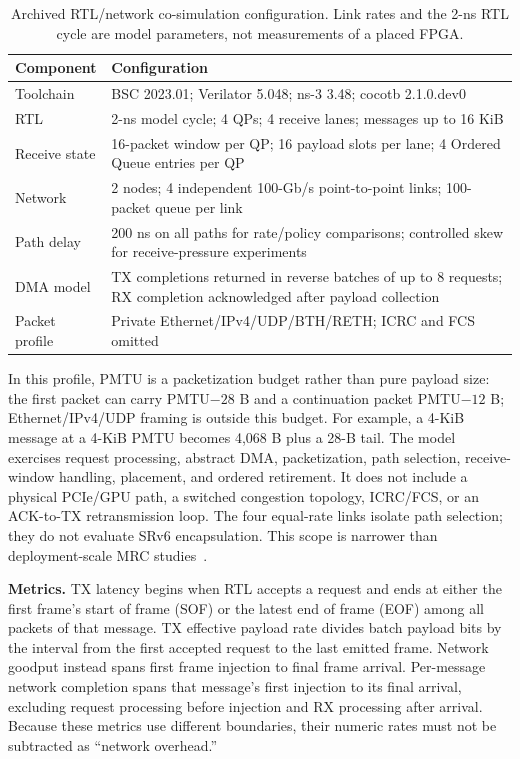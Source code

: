 \begin{table}[H]
  \centering
  \caption{Archived RTL/network co-simulation configuration.  Link rates and
  the 2-ns RTL cycle are model parameters, not measurements of a placed FPGA.}
  \label{tab:eval:configuration}
  \small
  \begin{tabular}{p{}p{}}
    \toprule
    Component & Configuration \\
    \midrule
    Toolchain & BSC 2023.01; Verilator 5.048; ns-3 3.48; cocotb 2.1.0.dev0 \\
    RTL & 2-ns model cycle; 4 QPs; 4 receive lanes; messages up to 16 KiB \\
    Receive state & 16-packet window per QP; 16 payload slots per lane;
      4 Ordered Queue entries per QP \\
    Network & 2 nodes; 4 independent 100-Gb/s point-to-point links;
      100-packet queue per link \\
    Path delay & 200 ns on all paths for rate/policy comparisons;
      controlled skew for receive-pressure experiments \\
    DMA model & TX completions returned in reverse batches of up to 8 requests;
      RX completion acknowledged after payload collection \\
    Packet profile & Private Ethernet/IPv4/UDP/BTH/RETH; ICRC and FCS omitted \\
    \bottomrule
  \end{tabular}
\end{table}

In this profile, PMTU is a packetization budget rather than pure payload size:
the first packet can carry PMTU$-28$ B and a continuation packet PMTU$-12$ B;
Ethernet/IPv4/UDP framing is outside this budget.  For example, a 4-KiB message
at a 4-KiB PMTU becomes 4,068 B plus a 28-B tail.
The model exercises request processing, abstract DMA, packetization, path
selection, receive-window handling, placement, and ordered retirement.  It does
not include a physical PCIe/GPU path, a switched congestion topology, ICRC/FCS,
or an ACK-to-TX retransmission loop.  The four equal-rate links isolate path
selection; they do not evaluate SRv6 encapsulation.  This scope is narrower than
deployment-scale MRC studies~\cite{mrc-srv6-paper}.

\textbf{Metrics.}
TX latency begins when RTL accepts a request and ends at either the first frame's
start of frame (SOF) or the latest end of frame (EOF) among all packets of that
message.  TX effective payload rate divides batch payload bits by the interval
from the first accepted request to the last emitted frame.  Network goodput
instead spans first frame injection to final frame arrival.  Per-message network
completion spans that message's first injection to its final arrival, excluding
request processing before injection and RX processing after arrival.  Because
these metrics use different boundaries, their numeric rates must not be
subtracted as ``network overhead.''

